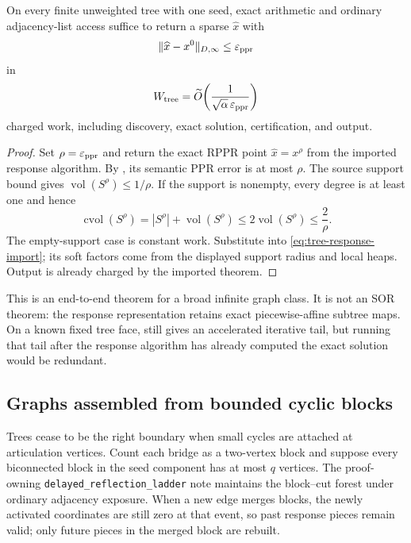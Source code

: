 \begin{theorem}
\label{thm:tree-semantic-ppr}
On every finite unweighted tree with one seed, exact arithmetic and ordinary
adjacency-list access suffice to return a sparse $\widehat x$ with
\begin{equation}
 \|\widehat x-x^0\|_{D,\infty}
 \leq\varepsilon_{\rm ppr}
 \label{eq:tree-semantic-target}
\end{equation}
in
\begin{equation}
 W_{\rm tree}
 =\widetilde O\!\left(
  \frac1{\sqrt\alpha\,\varepsilon_{\rm ppr}}
 \right)
 \label{eq:tree-semantic-work}
\end{equation}
charged work, including discovery, exact solution, certification, and output.
\end{theorem}

\begin{proof}
Set $\rho=\varepsilon_{\rm ppr}$ and return the exact RPPR point
$\widehat x=x^\rho$ from the imported response algorithm.  By
, its semantic PPR error is at most $\rho$.  The
source support bound gives
$\operatorname{vol}(S^\rho)\leq1/\rho$.  If the support is nonempty, every
degree is at least one and hence
\begin{equation*}
 \operatorname{cvol}(S^\rho)
 =|S^\rho|+\operatorname{vol}(S^\rho)
 \leq2\operatorname{vol}(S^\rho)
 \leq\frac2\rho.
\end{equation*}
The empty-support case is constant work.  Substitute into
\eqref{eq:tree-response-import}; its soft factors come from the displayed
support radius and local heaps.  Output is already charged by the imported
theorem.
\end{proof}

This is an end-to-end theorem for a broad infinite graph class.  It is not an
SOR theorem: the response representation retains exact piecewise-affine
subtree maps.  On a known fixed tree face, 
still gives an accelerated iterative tail, but running that tail after the
response algorithm has already computed the exact solution would be
redundant.

\subsection{Graphs assembled from bounded cyclic blocks}

Trees cease to be the right boundary when small cycles are attached at
articulation vertices.  Count each bridge as a two-vertex block and suppose
every biconnected block in the seed component has at most $q$ vertices.  The
proof-owning \texttt{delayed\_reflection\_ladder} note maintains the
block--cut forest under ordinary adjacency exposure.  When a new edge merges
blocks, the newly activated coordinates are still zero at that event, so
past response pieces remain valid; only future pieces in the merged block are
rebuilt.

